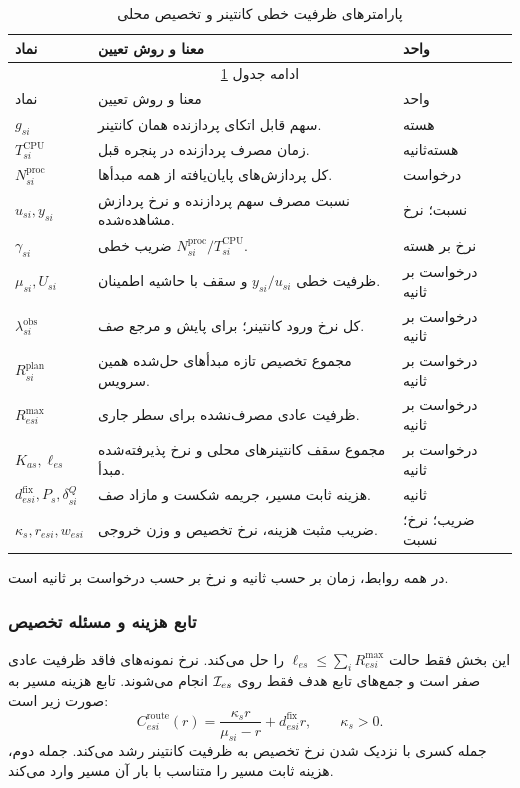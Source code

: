 \begin{longtable}{p{3.1cm}p{8.1cm}p{2.4cm}}
\caption{پارامترهای ظرفیت خطی کانتینر و تخصیص محلی}\label{tab:symbols}\\
\toprule نماد & معنا و روش تعیین & واحد \\
\midrule\endfirsthead
\multicolumn{3}{c}{ادامه جدول \ref{tab:symbols}}\\
\toprule نماد & معنا و روش تعیین & واحد \\
\midrule\endhead\bottomrule\endfoot
$g_{si}$ & سهم قابل اتکای پردازنده همان کانتینر. & هسته \\
$T^{\mathrm{CPU}}_{si}$ & زمان مصرف پردازنده در پنجره قبل. & هسته‌ثانیه \\
$N^{\mathrm{proc}}_{si}$ & کل پردازش‌های پایان‌یافته از همه مبدأها. & درخواست \\
$u_{si},y_{si}$ & نسبت مصرف سهم پردازنده و نرخ پردازش مشاهده‌شده. & نسبت؛ نرخ \\
$\gamma_{si}$ & ضریب خطی $N^{\mathrm{proc}}_{si}/T^{\mathrm{CPU}}_{si}$. & نرخ بر هسته \\
$\mu_{si},U_{si}$ & ظرفیت خطی $y_{si}/u_{si}$ و سقف با حاشیه اطمینان. & درخواست بر ثانیه \\
$\lambda^{\mathrm{obs}}_{si}$ & کل نرخ ورود کانتینر؛ برای پایش و مرجع صف. & درخواست بر ثانیه \\
$R^{\mathrm{plan}}_{si}$ & مجموع تخصیص تازه مبدأهای حل‌شده همین سرویس. & درخواست بر ثانیه \\
$R^{\mathrm{max}}_{esi}$ & ظرفیت عادی مصرف‌نشده برای سطر جاری. & درخواست بر ثانیه \\
$K_{as},\ell_{es}$ & مجموع سقف کانتینرهای محلی و نرخ پذیرفته‌شده مبدأ. & درخواست بر ثانیه \\
$d^{\mathrm{fix}}_{esi},P_s,\delta^Q_{si}$ & هزینه ثابت مسیر، جریمه شکست و مازاد صف. & ثانیه \\
$\kappa_s,r_{esi},w_{esi}$ & ضریب مثبت هزینه، نرخ تخصیص و وزن خروجی. & ضریب؛ نرخ؛ نسبت \\
\end{longtable}
در همه روابط، زمان بر حسب ثانیه و نرخ بر حسب درخواست بر ثانیه است.

\subsubsection{تابع هزینه و مسئله تخصیص}

این بخش فقط حالت $\ell_{es}\leq\sum_iR^{\mathrm{max}}_{esi}$ را حل می‌کند. نرخ نمونه‌های فاقد ظرفیت عادی صفر است و جمع‌های تابع هدف فقط روی $\mathcal I_{es}$ انجام می‌شوند. تابع هزینه مسیر به صورت زیر است:
\begin{equation}
  C^{\mathrm{route}}_{esi}(r)
  =\frac{\kappa_s r}{\mu_{si}-r}
    +d^{\mathrm{fix}}_{esi}r,
  \qquad \kappa_s>0.
  \label{eq:route-cost}
\end{equation}
جمله کسری با نزدیک شدن نرخ تخصیص به ظرفیت کانتینر رشد می‌کند. جمله دوم، هزینه ثابت مسیر را متناسب با بار آن مسیر وارد می‌کند.

